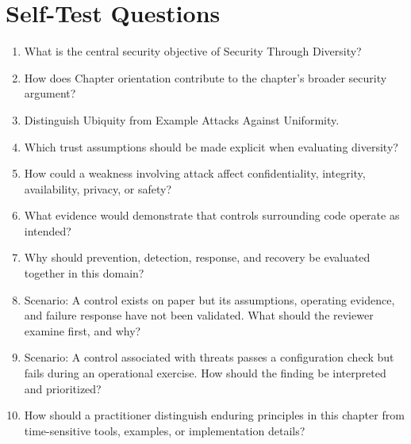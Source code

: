 \documentclass[11pt]{article}
\begin{document}
\section*{Self-Test Questions}
\begin{enumerate}
\item What is the central security objective of Security Through Diversity?
\item How does Chapter orientation contribute to the chapter's broader security argument?
\item Distinguish Ubiquity from Example Attacks Against Uniformity.
\item Which trust assumptions should be made explicit when evaluating diversity?
\item How could a weakness involving attack affect confidentiality, integrity, availability, privacy, or safety?
\item What evidence would demonstrate that controls surrounding code operate as intended?
\item Why should prevention, detection, response, and recovery be evaluated together in this domain?
\item Scenario: A control exists on paper but its assumptions, operating evidence, and failure response have not been validated. What should the reviewer examine first, and why?
\item Scenario: A control associated with threats passes a configuration check but fails during an operational exercise. How should the finding be interpreted and prioritized?
\item How should a practitioner distinguish enduring principles in this chapter from time-sensitive tools, examples, or implementation details?
\end{enumerate}
\end{document}
